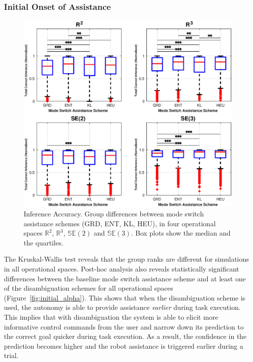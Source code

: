 \documentclass[conference]{IEEEtran}
\begin{document}
\subsubsection{Initial Onset of Assistance}
\begin{figure}[t!]
	\centering
	\includegraphics[width= 1.1\hsize, height=0.5\vsize]{./figures/correct_inference.eps}
	\vspace{-0.75cm}
	\caption{Inference Accuracy. Group differences between mode switch assistance schemes (GRD, ENT, KL, HEU), in four operational spaces $\mathbb{R}^2$, $\mathbb{R}^3$, $\mathbb{SE}(2)$ and $\mathbb{SE}(3)$. Box plots show the median and the quartiles.} 
	\label{fig:correct_inference}
\end{figure}

The Kruskal-Wallis test reveals that the group ranks are different for simulations in all operational spaces. Post-hoc analysis also reveals statistically significant differences between the baseline mode switch assistance scheme and at least one of the disambiguation schemes for all operational spaces (Figure~\ref{fig:initial_alpha}). This shows that when the disambiguation scheme is used, the autonomy is able to provide assistance \textit{earlier} during task execution. This implies that with disambiguation the system is able to elicit more informative control commands from the user and narrow down its prediction to the correct goal quicker during task execution. As a result, the confidence in the prediction becomes higher and the robot assistance is triggered earlier during a trial. 
\end{document}
